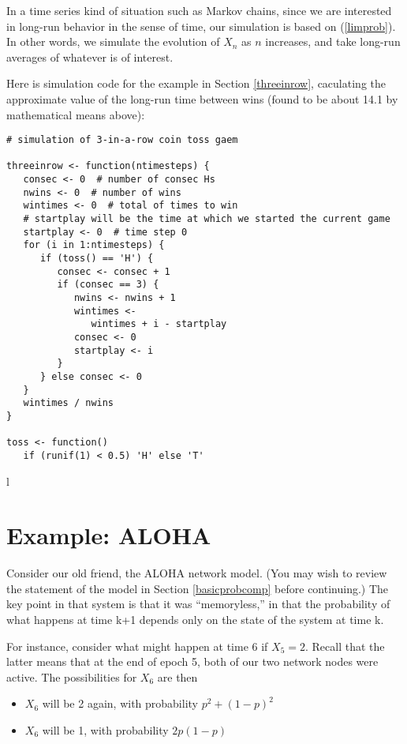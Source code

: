 In a time series kind of situation such as Markov chains, since
we are interested in long-run behavior in the sense of time, our
simulation is based on (\ref{limprob}).  In other words, we simulate
the evolution of $X_n$ as $n$ increases, and take long-run averages of
whatever is of interest.

Here is simulation code for the example in Section \ref{threeinrow},
caculating the approximate value of the long-run time between wins
(found to be about 14.1 by mathematical means above):

\begin{lstlisting}
# simulation of 3-in-a-row coin toss gaem

threeinrow <- function(ntimesteps) {
   consec <- 0  # number of consec Hs
   nwins <- 0  # number of wins
   wintimes <- 0  # total of times to win
   # startplay will be the time at which we started the current game
   startplay <- 0  # time step 0
   for (i in 1:ntimesteps) {
      if (toss() == 'H') {
         consec <- consec + 1 
         if (consec == 3) {
            nwins <- nwins + 1
            wintimes <- 
               wintimes + i - startplay
            consec <- 0
            startplay <- i
         }
      } else consec <- 0
   }
   wintimes / nwins
}

toss <- function() 
   if (runif(1) < 0.5) 'H' else 'T'
\end{lstlisting}l

\section{Example:  ALOHA}

Consider our old friend, the ALOHA network model.  (You
may wish to review the statement of the model in Section
\ref{basicprobcomp} before continuing.)  The key point in that system is
that it was ``memoryless,'' in that the probability of what happens at
time k+1 depends only on the state of the system at time k.

For instance, consider what might happen at time 6 if $X_5 = 2$.  Recall
that the latter means that at the end of epoch 5, both of our two
network nodes were active.  The possibilities for $X_6$ are then

\begin{itemize}

\item $X_6$ will be 2 again, with probability $p^2 + (1-p)^2$

\item $X_6$ will be 1, with probability $2p(1-p)$

\end{itemize}


